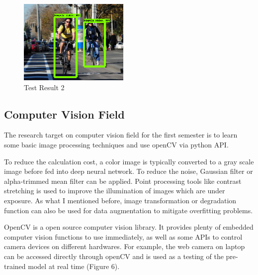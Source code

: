 \documentclass[titlepage]{article}
\begin{document}
\newpage
\begin{figure}[htbp]
\centering
\includegraphics[width=200]{test2.png}
\caption{Test Result 2}
\end{figure}

\subsection{Computer Vision Field}
\label{sec:org9b66367}
The research target on computer vision field for the first semester is to
learn some basic image processing techniques and use openCV via python
API. 

To reduce the calculation cost, a color image is typically converted to
a gray scale image before fed into deep neural network. To reduce the noise,
Gaussian filter or alpha-trimmed mean filter can be applied. Point processing
tools like contrast stretching is used to improve the illumination of images
which are under exposure. As what I mentioned before, image transformation or
degradation function can also be used for data augmentation to mitigate
overfitting problems. 

OpenCV is a open source computer vision library. It provides plenty of
embedded computer vision functions to use immediately, as well as some APIs
to control camera devices on different hardwares. For example, the web camera
on laptop can be accessed directly through openCV and is used as a testing of
the pre-trained model at real time (Figure 6).
\end{document}
